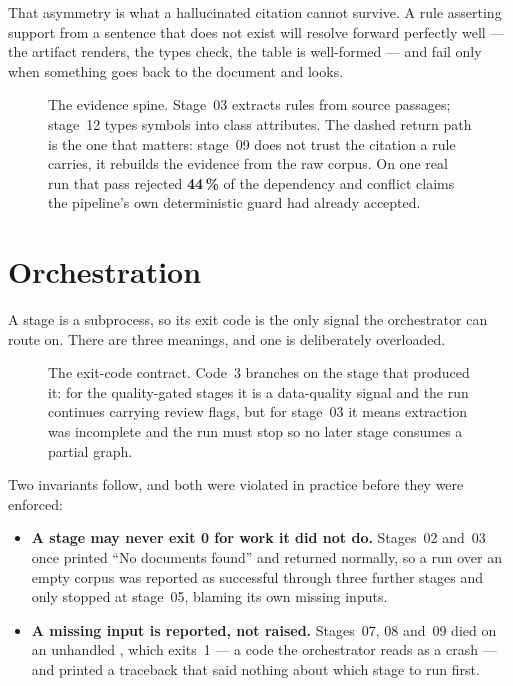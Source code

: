 \documentclass[11pt]{article}
\begin{document}
That asymmetry is what a hallucinated citation cannot survive. A rule
asserting support from a sentence that does not exist will resolve forward
perfectly well --- the artifact renders, the types check, the table is
well-formed --- and fail only when something goes back to the document and
looks.

\begin{figure}[htbp]
  \centering
  \resizebox{\linewidth}{!}{}
  \caption{The evidence spine. Stage~03 extracts rules from source
    passages; stage~12 types symbols into class attributes. The dashed
    return path is the one that matters: stage~09 does not trust the
    citation a rule carries, it rebuilds the evidence from the raw corpus.
    On one real run that pass rejected \textbf{44\,\%} of the dependency and
    conflict claims the pipeline's own deterministic guard had already
    accepted.}
  \label{fig:spine}
\end{figure}

\section{Orchestration}

A stage is a subprocess, so its exit code is the only signal the
orchestrator can route on. There are three meanings, and one is
deliberately overloaded.

\begin{figure}[htbp]
  \centering
  \resizebox{0.96\linewidth}{!}{}
  \caption{The exit-code contract. Code~3 branches on the stage that
    produced it: for the quality-gated stages it is a data-quality signal
    and the run continues carrying review flags, but for stage~03 it means
    extraction was incomplete and the run must stop so no later stage
    consumes a partial graph.}
  \label{fig:exitcodes}
\end{figure}

Two invariants follow, and both were violated in practice before they were
enforced:

\begin{itemize}
  \item \textbf{A stage may never exit 0 for work it did not do.}
    Stages~02 and~03 once printed ``No documents found'' and returned
    normally, so a run over an empty corpus was reported as successful
    through three further stages and only stopped at stage~05, blaming its
    own missing inputs.
  \item \textbf{A missing input is reported, not raised.} Stages~07, 08
    and~09 died on an unhandled , which exits~1 ---
    a code the orchestrator reads as a crash --- and printed a traceback
    that said nothing about which stage to run first.
\end{itemize}
\end{document}
